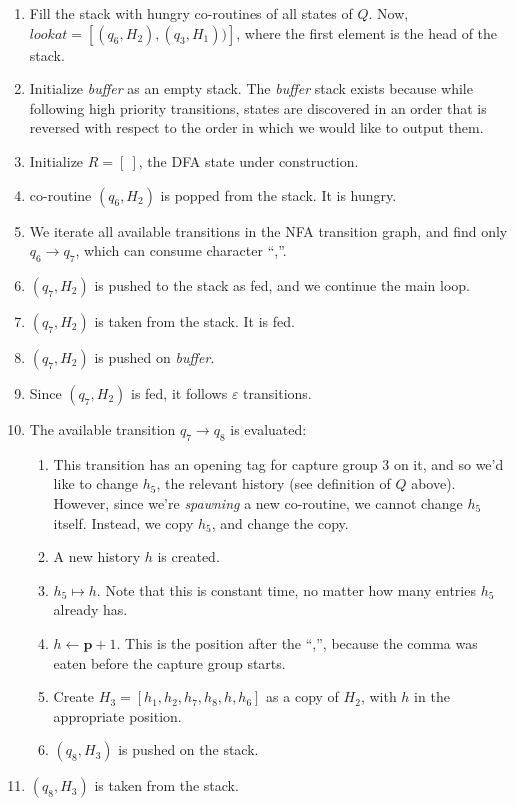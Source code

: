 \documentclass[11pt,a4paper,twoside,openright]{Thesis}
\theoremstyle{definition}
\newcommand{\pos}{\mathbf{\mathbf{p}}}
\begin{document}
\begin{example}
\begin{enumerate}
\item Fill the stack with hungry co-routines of all states of $Q$.
  Now, $\mathit{lookat}=[(q_6, H_2), (q_3, H_1))]$, where the first element
  is the head of the stack.
\item Initialize \emph{buffer} as an empty stack.
  The \emph{buffer} stack exists because while following high priority
  transitions, states are discovered in an order that is reversed with respect
  to the order in which we would like to output them.
\item Initialize $R=[\ ]$, the DFA state under construction.
\item co-routine $(q_6,H_2)$ is popped from the stack. It is hungry.
\item We iterate all available transitions in the NFA transition graph, and
  find only $q_6\rightarrow q_7$, which can consume character ``,''.
\item $(q_7, H_2)$ is pushed to the stack as fed, and we continue the main loop.
\item $(q_7, H_2)$ is taken from the stack. It is fed.
\item $(q_7, H_2)$ is pushed on \emph{buffer}.
\item Since $(q_7, H_2)$ is fed, it follows $\varepsilon$ transitions.
\item The available transition $q_7\rightarrow q_8$ is evaluated:
  \begin{enumerate}
    \item 	This transition has an opening tag for capture group 3 on it, and so we'd like to change $h_5$,
      the relevant history (see definition of $Q$ above). However, since we're \emph{spawning} a new co-routine, we cannot change $h_5$ itself.
      Instead, we copy $h_5$, and change the copy.
    \item	A new history $h$ is created.
    \item 	$h_5 \mapsto h$. Note that this is constant time, no matter how many entries $h_5$ already has.
    \item 	$h\leftarrow\pos+1$. This is the position after the ``,'', because the comma was eaten before the capture
        group starts.
    \item	Create $H_3 = [h_1, h_2, h_7, h_8, h, h_6]$ as a copy of $H_2$, with $h$ in the appropriate position.
    \item $(q_8, H_3)$ is pushed on the stack.
  \end{enumerate}
\item $(q_8, H_3)$ is taken from the stack.

\end{enumerate}
\end{example}
\end{document}
